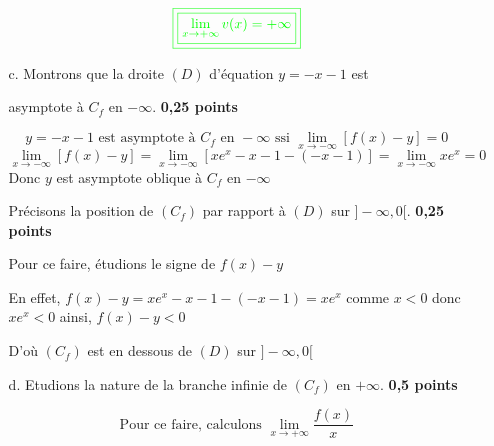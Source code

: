 \documentclass[12pt]{article}
\begin{document}
\begin{enumerate}
\begin{enumerate}
\[\textcolor{green}{\boxed{\textcolor{green}{\boxed{\lim_{x\to +\infty}v(x)=+\infty}}}}\]
\item[c.]Montrons que la droite $(D)$ d'équation $y=-x-1$ est

 asymptote à $C_{f}$ en $-\infty$. \textbf{ 0,25 points}

\[y=-x-1 \text{ est asymptote à } C_{f} \text{ en } -\infty \text{ ssi } \lim_{x \to -\infty}\left[f(x)-y \right]=0 \]
\[\lim_{x \to -\infty}\left[f(x)-y \right]=\lim_{x \to -\infty}\left[xe^{x}-x-1-(-x-1) \right]=\lim_{x \to -\infty}xe^{x}=0\]
Donc $y$ est asymptote oblique à $ C_{f}$ en $-\infty$

Précisons la position de $(C_{f})$ par rapport à $(D)$ sur $]-\infty, 0[.$ \textbf{ 0,25 points}

Pour ce faire, étudions le signe de $f(x)-y$

En effet, $f(x)-y=xe^{x}-x-1-(-x-1)=xe^{x}$ comme $x < 0 $ donc $xe^{x} < 0$ ainsi, $f(x)-y<0$

D'où  $(C_{f})$ est en dessous de $(D)$ sur $]-\infty, 0[$
\item[d.]Etudions la nature de la branche infinie de $(C_{f})$ en $+\infty$.\textbf{ 0,5 points}

\[\text{Pour ce faire, calculons } \lim_{x \to +\infty}\frac{f(x)}{x} \]


\end{enumerate}
\end{enumerate}
\end{document}
